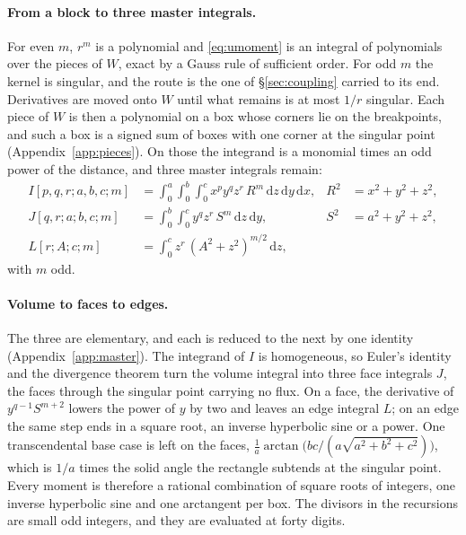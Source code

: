 \documentclass[11pt,a4paper]{article}
\newcommand{\dd}{\mathrm{d}}
\begin{document}
\paragraph{From a block to three master integrals.} For even $m$, $r^m$ is a polynomial and
\eqref{eq:umoment} is an integral of polynomials over the pieces of $W$, exact by a Gauss rule of
sufficient order. For odd $m$ the kernel is singular, and the route is the one of \S\ref{sec:coupling}
carried to its end. Derivatives are moved onto $W$ until what remains is at most $1/r$ singular. Each
piece of $W$ is then a polynomial on a box whose corners lie on the breakpoints, and such a box is a
signed sum of boxes with one corner at the singular point (Appendix~\ref{app:pieces}). On those the
integrand is a monomial times an odd power of the distance, and three master integrals remain:
\begin{align}
  I[p,q,r;a,b,c;m]&=\int_0^a\!\!\int_0^b\!\!\int_0^c x^py^qz^r\,R^m\,\dd z\,\dd y\,\dd x,
  &R^2&=x^2+y^2+z^2,\label{eq:boxI}\\
  J[q,r;a;b,c;m]&=\int_0^b\!\!\int_0^c y^qz^r\,S^m\,\dd z\,\dd y,
  &S^2&=a^2+y^2+z^2,\label{eq:faceJ}\\
  L[r;A;c;m]&=\int_0^c z^r\,(A^2+z^2)^{m/2}\,\dd z,\label{eq:lineL}
\end{align}
with $m$ odd.

\paragraph{Volume to faces to edges.} The three are elementary, and each is reduced to the next by one
identity (Appendix~\ref{app:master}). The integrand of $I$ is homogeneous, so Euler's identity and the
divergence theorem turn the volume integral into three face integrals $J$, the faces through the singular
point carrying no flux. On a face, the derivative of $y^{q-1}S^{m+2}$ lowers the power of $y$ by two and
leaves an edge integral $L$; on an edge the same step ends in a square root, an inverse hyperbolic sine or
a power. One transcendental base case is left on the faces, $\tfrac1a\arctan\bigl(bc/(a\sqrt{a^2+b^2+c^2})
\bigr)$, which is $1/a$ times the solid angle the rectangle subtends at the singular point. Every moment
is therefore a rational combination of square roots of integers, one inverse hyperbolic sine and one
arctangent per box. The divisors in the recursions are small odd integers, and they are evaluated at
forty digits.
\end{document}
